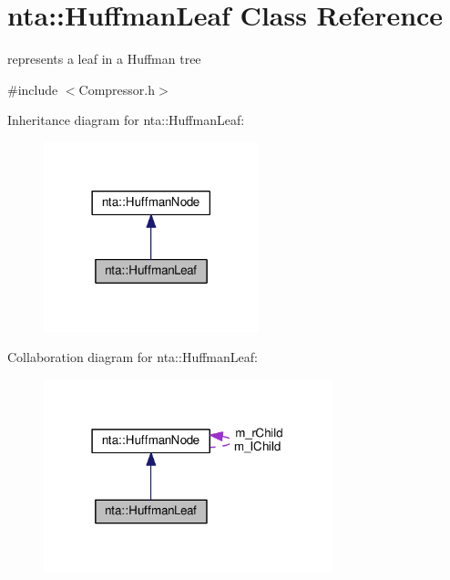 \hypertarget{classnta_1_1HuffmanLeaf}{}\section{nta\+:\+:Huffman\+Leaf Class Reference}
\label{classnta_1_1HuffmanLeaf}


represents a leaf in a Huffman tree  




{\ttfamily \#include $<$Compressor.\+h$>$}



Inheritance diagram for nta\+:\+:Huffman\+Leaf\+:
\nopagebreak
\begin{figure}[H]
\begin{center}
\leavevmode
\includegraphics[width=177pt]{df/d39/classnta_1_1HuffmanLeaf__inherit__graph}
\end{center}
\end{figure}


Collaboration diagram for nta\+:\+:Huffman\+Leaf\+:
\nopagebreak
\begin{figure}[H]
\begin{center}
\leavevmode
\includegraphics[width=238pt]{d7/d69/classnta_1_1HuffmanLeaf__coll__graph}
\end{center}
\end{figure}
